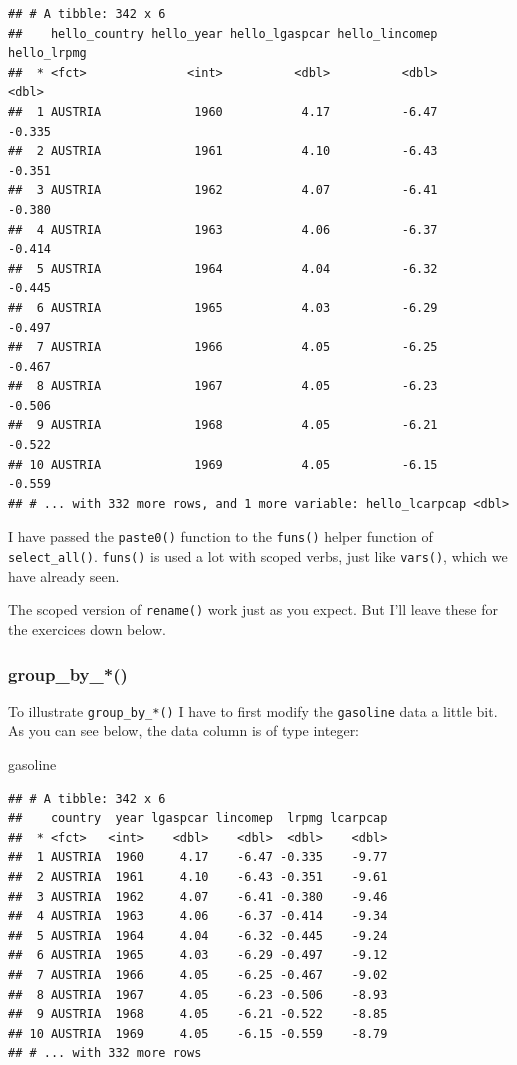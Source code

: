 \documentclass[]{gitbook}
\newenvironment{Shaded}{\begin{snugshade}}{\end{snugshade}}
\newcommand{\NormalTok}[1]{#1}
\theoremstyle{definition}
\theoremstyle{definition}
\theoremstyle{definition}
\theoremstyle{remark}
\begin{document}
\begin{verbatim}
## # A tibble: 342 x 6
##    hello_country hello_year hello_lgaspcar hello_lincomep hello_lrpmg
##  * <fct>              <int>          <dbl>          <dbl>       <dbl>
##  1 AUSTRIA             1960           4.17          -6.47      -0.335
##  2 AUSTRIA             1961           4.10          -6.43      -0.351
##  3 AUSTRIA             1962           4.07          -6.41      -0.380
##  4 AUSTRIA             1963           4.06          -6.37      -0.414
##  5 AUSTRIA             1964           4.04          -6.32      -0.445
##  6 AUSTRIA             1965           4.03          -6.29      -0.497
##  7 AUSTRIA             1966           4.05          -6.25      -0.467
##  8 AUSTRIA             1967           4.05          -6.23      -0.506
##  9 AUSTRIA             1968           4.05          -6.21      -0.522
## 10 AUSTRIA             1969           4.05          -6.15      -0.559
## # ... with 332 more rows, and 1 more variable: hello_lcarpcap <dbl>
\end{verbatim}

I have passed the \texttt{paste0()} function to the \texttt{funs()}
helper function of \texttt{select\_all()}. \texttt{funs()} is used a lot
with scoped verbs, just like \texttt{vars()}, which we have already
seen.

The scoped version of \texttt{rename()} work just as you expect. But
I'll leave these for the exercices down below.

\hypertarget{group_by_}{%
\subsubsection{group\_by\_*()}\label{group_by_}}

To illustrate \texttt{group\_by\_*()} I have to first modify the
\texttt{gasoline} data a little bit. As you can see below, the data
column is of type integer:

\begin{Shaded}
\begin{Highlighting}[]
\NormalTok{gasoline}
\end{Highlighting}
\end{Shaded}

\begin{verbatim}
## # A tibble: 342 x 6
##    country  year lgaspcar lincomep  lrpmg lcarpcap
##  * <fct>   <int>    <dbl>    <dbl>  <dbl>    <dbl>
##  1 AUSTRIA  1960     4.17    -6.47 -0.335    -9.77
##  2 AUSTRIA  1961     4.10    -6.43 -0.351    -9.61
##  3 AUSTRIA  1962     4.07    -6.41 -0.380    -9.46
##  4 AUSTRIA  1963     4.06    -6.37 -0.414    -9.34
##  5 AUSTRIA  1964     4.04    -6.32 -0.445    -9.24
##  6 AUSTRIA  1965     4.03    -6.29 -0.497    -9.12
##  7 AUSTRIA  1966     4.05    -6.25 -0.467    -9.02
##  8 AUSTRIA  1967     4.05    -6.23 -0.506    -8.93
##  9 AUSTRIA  1968     4.05    -6.21 -0.522    -8.85
## 10 AUSTRIA  1969     4.05    -6.15 -0.559    -8.79
## # ... with 332 more rows
\end{verbatim}
\end{document}
